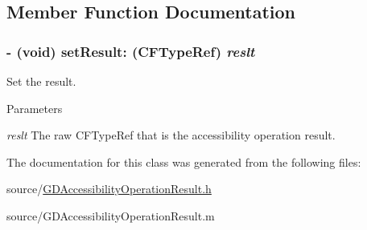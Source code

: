 \subsection{Member Function Documentation}
\hypertarget{interface_g_d_accessibility_operation_result_abc0beacffc69b1116f6a332b26b0aeb8}{
\subsubsection[{setResult:}]{\setlength{\rightskip}{0pt plus 5cm}-\/ (void) setResult: (CFTypeRef) {\em reslt}}}
\label{interface_g_d_accessibility_operation_result_abc0beacffc69b1116f6a332b26b0aeb8}


Set the result. 
\begin{DoxyParams}{Parameters}
\item[{\em reslt}]The raw CFTypeRef that is the accessibility operation result. \end{DoxyParams}


The documentation for this class was generated from the following files:\begin{DoxyCompactItemize}
\item 
source/\hyperlink{_g_d_accessibility_operation_result_8h}{GDAccessibilityOperationResult.h}\item 
source/GDAccessibilityOperationResult.m\end{DoxyCompactItemize}
